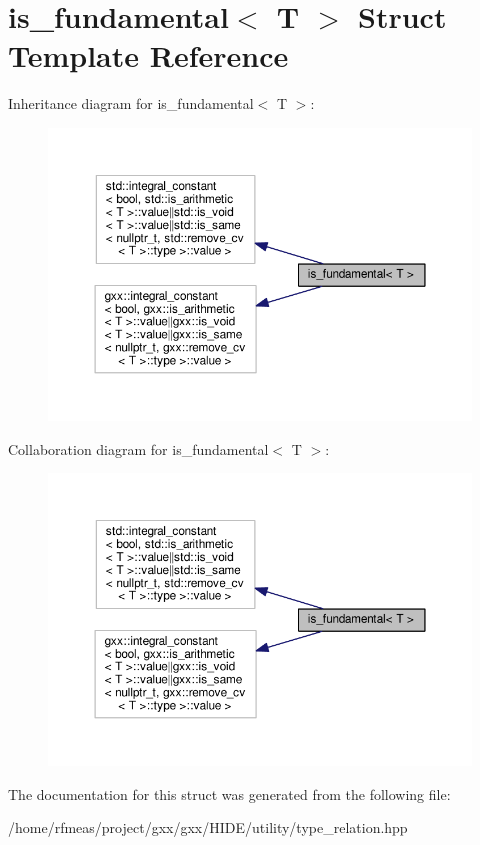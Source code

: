 \hypertarget{structis__fundamental}{}\section{is\+\_\+fundamental$<$ T $>$ Struct Template Reference}
\label{structis__fundamental}


Inheritance diagram for is\+\_\+fundamental$<$ T $>$\+:
\nopagebreak
\begin{figure}[H]
\begin{center}
\leavevmode
\includegraphics[width=350pt]{structis__fundamental__inherit__graph}
\end{center}
\end{figure}


Collaboration diagram for is\+\_\+fundamental$<$ T $>$\+:
\nopagebreak
\begin{figure}[H]
\begin{center}
\leavevmode
\includegraphics[width=350pt]{structis__fundamental__coll__graph}
\end{center}
\end{figure}


The documentation for this struct was generated from the following file\+:\begin{DoxyCompactItemize}
\item 
/home/rfmeas/project/gxx/gxx/\+H\+I\+D\+E/utility/type\+\_\+relation.\+hpp\end{DoxyCompactItemize}
